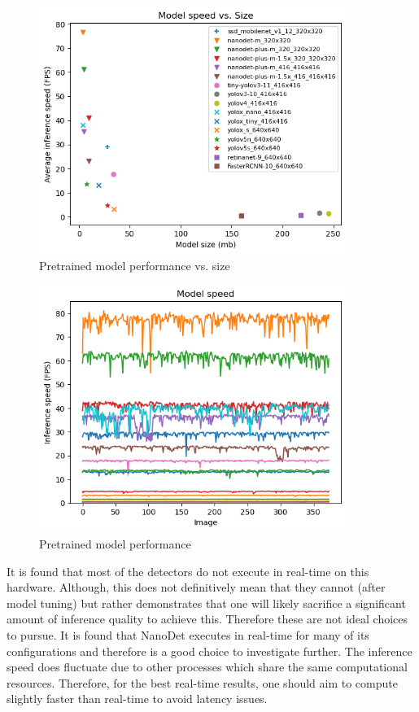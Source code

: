 \documentclass[a4paper,twoside,12pt]{report}
\begin{document}
\begin{figure}[h!]
\begin{center}
\includegraphics[width=10cm]{images/modelspeedsize.png}
\caption{Pretrained model performance vs. size}
\label{fig:modelspeedsize}
\end{center}
\end{figure}

\begin{figure}[h!]
\begin{center}
\includegraphics[width=10cm]{images/modelspeed.png}
\caption{Pretrained model performance}
\label{fig:modelspeed}
\end{center}
\end{figure}

It is found that most of the detectors do not execute in real-time on this hardware. Although, this does not definitively mean that they cannot (after model tuning) but rather demonstrates that one will likely sacrifice a significant amount of inference quality to achieve this. Therefore these are not ideal choices to pursue. It is found that NanoDet executes in real-time for many of its configurations and therefore is a good choice to investigate further. The inference speed does fluctuate due to other processes which share the same computational resources. Therefore, for the best real-time results, one should aim to compute slightly faster than real-time to avoid latency issues. 
\end{document}
